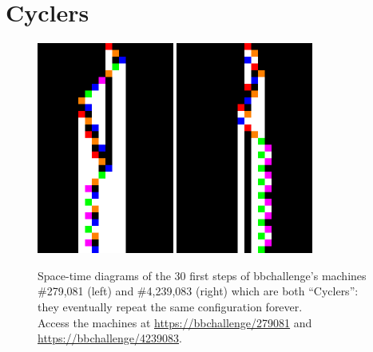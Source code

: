 \section{Cyclers}\label{sec:cyclers}

\begin{figure}[h!]
        \centering
        \includegraphics[width=0.4\textwidth]{space-time-diagrams/cycler_279081.pdf}
        \hspace{2ex}
        \includegraphics[width=0.4\textwidth]{space-time-diagrams/cycler_4239083.pdf}
        \caption{Space-time diagrams of the 30 first steps of bbchallenge's machines \#279,081 (left) and \#4,239,083 (right) which are both ``Cyclers'': they eventually repeat the same configuration forever. \\
                Access the machines at \url{https://bbchallenge/279081} and
                \url{https://bbchallenge/4239083}.}\label{fig:cyclers}
\end{figure}

